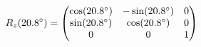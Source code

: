 \documentclass[preview]{standalone}
\begin{document}
\begin{align*}
\special{dvisvgm:raw <g id='unique000'>}R_z(20.8^\circ) = \begin{pmatrix} \cos(20.8^\circ) & -\sin(20.8^\circ) & 0 \\ \sin(20.8^\circ) & \cos(20.8^\circ) & 0 \\ 0 & 0 & 1 \end{pmatrix}\special{dvisvgm:raw </g>}
\end{align*}
\end{document}
